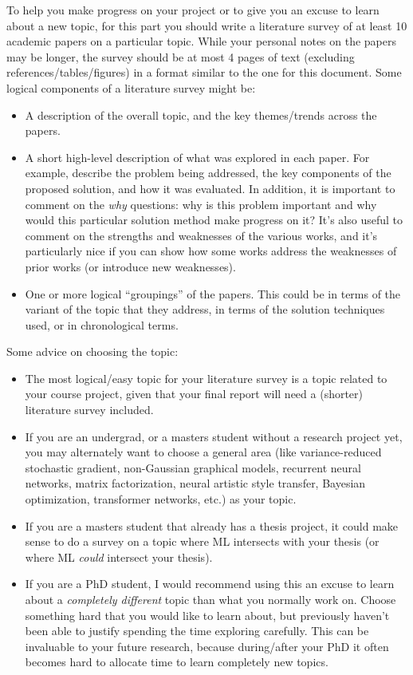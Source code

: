 \documentclass{article}
\def\blu#1{{\color{blu}#1}}
\def\items#1{\begin{itemize}#1\end{itemize}}
\begin{document}
To help you make progress on your project or to give you an excuse to learn about a new topic, for this part you should \blu{write a literature survey of at least 10 academic papers} on a particular topic. While your personal notes on the papers may be longer, the survey should be \blu{at most 4 pages of text (excluding references/tables/figures)} in a format similar to the one for this document. Some logical components of a literature survey might be:
\items{
\item A description of the overall topic, and the key themes/trends across the papers.
\item A short high-level description of what was explored in each paper. For example, describe the problem being addressed, the key components of the proposed solution, and how it was evaluated. In addition, it is important to comment on the \emph{why} questions: why is this problem important and why would this particular solution method make progress on it? It's also useful to comment on the strengths and weaknesses of the various works, and it's particularly nice if you can show how some works address the weaknesses of prior works (or introduce new weaknesses).
\item One or more logical ``groupings'' of the papers. This could be in terms of the variant of the topic that they address, in terms of the solution techniques used, or in chronological terms.
}

Some advice on choosing the topic:
\items{
\item The most logical/easy topic for your literature survey is a topic related to your course project, given that your final report will need a (shorter) literature survey included.
\item If you are an undergrad, or a masters student without a research project yet, you may alternately want to choose a general area (like variance-reduced stochastic gradient, non-Gaussian graphical models, recurrent neural networks, matrix factorization, neural artistic style transfer, Bayesian optimization, transformer networks, etc.) as your topic.
\item If you are a masters student that already has a thesis project, it could make sense to do a survey on a topic where ML intersects with your thesis (or where ML \emph{could} intersect your thesis).
\item If you are a PhD student, I would recommend using this an excuse to learn about a \emph{completely different} topic than what you normally work on. Choose something hard that you would like to learn about, but previously haven't been able to justify spending the time exploring carefully. This can be invaluable to your future research, because during/after your PhD it often becomes hard to allocate time to learn completely new topics.
}



 
\end{document}
